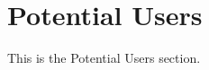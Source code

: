\documentclass[proposal.tex]{subfiles}
\begin{document}
    
\section{Potential Users}

This is the Potential Users section.
\end{document}
